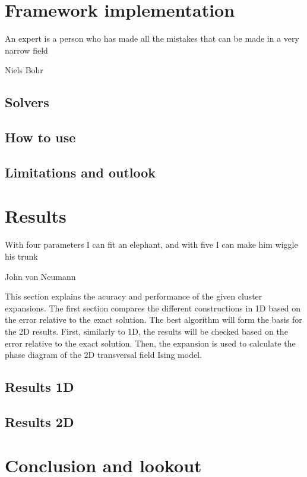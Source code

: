 \documentclass{book}
\newcounter{a}
\newcounter{b}
\begin{document}
\chapter{Framework implementation}


\epigraph{An expert is a person who has made all the mistakes that can be made in a very narrow field}{Niels Bohr}

\section{Solvers} \label{sec:framework_impl}


\section{How to use}


\section{Limitations and outlook}


\chapter{Results} \label{chap:results}

\epigraph{With four parameters I can fit an elephant, and with five I can make him wiggle his trunk}{John von Neumann}

%

This section explains the acuracy and performance of the given cluster expansions. The first section compares the different constructions in 1D based on the error relative to the exact solution. The best algorithm will form the basis for the 2D results. First, similarly to 1D, the results will be checked based on the error relative to the exact solution. Then, the expansion is used to calculate the phase diagram of the 2D transversal field Ising model.

\section{Results 1D}\label{sec:results1d}


\section{Results 2D}


\chapter{Conclusion and lookout}





\end{document}

